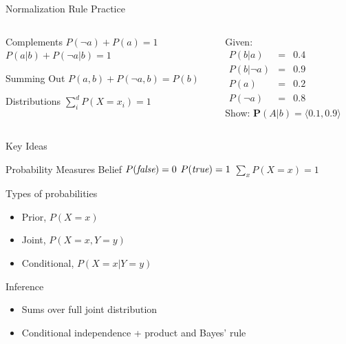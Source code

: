 \documentclass[12pt]{beamer}
\newcommand{\EM}[1]{\mbox{\em#1}}
\newcommand{\tab}{\hspace{1em}}
\begin{document}
\begin{frame}{Normalization Rule Practice}
	\begin{columns}
		\begin{column}{2in}
			\begin{block}{Complements}
				$P(\lnot a) + P(a) = 1$ \\
				$P(a|b) + P(\lnot a|b) = 1$
			\end{block}
			\begin{block}{Summing Out}
				$P(a, b) + P(\lnot a, b) = P(b)$
			\end{block}
			\begin{block}{Distributions}
				$\sum\limits^{d}_{i}{P(X=x_{i})} = 1$
			\end{block}
		\end{column}
		\begin{column}{2.4in}
			\small
			Given:
			\\ \smallskip
			$
			\begin{array}{lll}
				P(b|a)       & = & 0.4 \\
				P(b|\lnot a) & = & 0.9 \\
				P(a)         & = & 0.2 \\
				P(\lnot a)   & = & 0.8
			\end{array}
			$
			\\ \bigskip
			Show: $\mathbf{P}(A|b) = \langle 0.1, 0.9 \rangle$
		\end{column}
	\end{columns}
\end{frame}
\begin{frame}{Key Ideas}
	\begin{block}{Probability Measures Belief}
		$P(\EM{false}) = 0$ \tab $P(\EM{true}) = 1$ \tab\tab\tab $\sum\limits_{x}P(X\!=\!x) = 1$
	\end{block}
	\begin{block}{Types of probabilities}
		\begin{itemize}
			\item Prior, $P(X\!=\!x)$
			\item Joint, $P(X\!=\!x,Y\!=\!y)$
			\item Conditional, $P(X\!=\!x|Y\!=\!y)$
		\end{itemize}
	\end{block}
	\begin{block}{Inference}
		\begin{itemize}
			\item Sums over full joint distribution
			\item Conditional independence + product and Bayes' rule
		\end{itemize}
	\end{block}
\end{frame}
\end{document}
